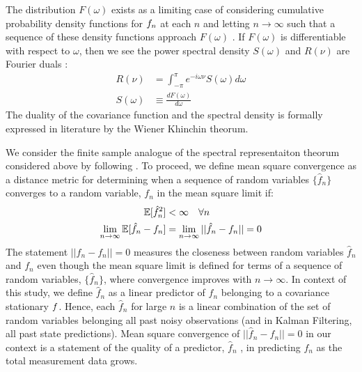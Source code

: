 The distribution $F(\omega)$ exists as a limiting case of considering cumulative probability density functions for $f_n$ at each $n$ and letting $n \to \infty$ such that a sequence of these density functions approach $F(\omega)$ \cite{karlin1975first}.  If $F(\omega)$ is differentiable with respect to $\omega$, then we see the power spectral density $S(\omega)$ and $R(\nu)$ are Fourier duals \cite{karlin1975first}:
\begin{align}
R(\nu) & = \int_{-\pi}^{\pi} e^{-i\omega \nu } S(\omega)d\omega \\
S(\omega) & \equiv \frac{dF(\omega)}{d\omega} 
\end{align}
The duality of the covariance function and the spectral density is formally expressed  in literature by the  Wiener Khinchin theorum.

We consider the finite sample analogue of the spectral representaiton theorum considered above by following \cite{hamilton1994time}. To proceed, we define mean square convergence as a distance metric for determining when a sequence of random variables $\{ \hat{f}_n\}$ converges to a random variable, $f_n$ in the mean square limit if:
\begin{align}
\mathbb{E}[\hat{f}_n^2] & < \infty \quad \forall n \\
\lim_{n \to \infty}\mathbb{E}[\hat{f}_n - f_n] & = \lim_{n \to \infty} ||\hat{f}_n- f_n || = 0
\end{align} 
The statement $||\hat{f}_n- f_n || = 0$ measures the closeness between random variables $\hat{f}_n$ and $f_n$ even though the mean square limit is defined for terms of a sequence of random variables, $\{ \hat{f}_n\}$, where convergence improves with $n \to \infty$. In context of this study, we define $\hat{f}_n$ as a linear predictor of $f_n$ belonging to a covariance stationary $f$. Hence, each $\hat{f}_n$ for large $n$ is a linear combination of the set of random variables belonging all past noisy observations (and in Kalman Filtering,  all past state predictions). Mean square convergence of $||\hat{f}_n- f_n || = 0$ in our context is a statement of the quality of a predictor, $\hat{f}_n$ , in predicting $f_n$ as the total measurement data grows.

